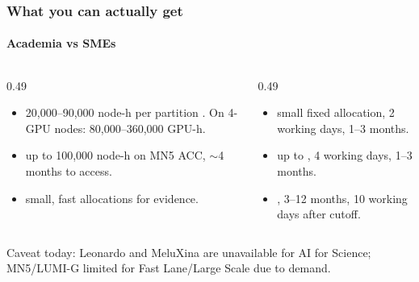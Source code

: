 \documentclass[10pt,aspectratio=169,notheorems]{beamer}
\begin{document}
\begin{frame}
    \frametitle{What you can actually get}
    \framesubtitle{Academia vs SMEs}
    \begin{columns}[t]
        \begin{column}{0.49\textwidth}
        \begin{itemize}
            \item {} 20{,}000--90{,}000 node-h per partition \citep{eurohpc2026ai}. On 4-GPU nodes: 80{,}000--360{,}000 GPU-h.
            \item {} up to 100{,}000 node-h on MN5 ACC, $\sim$4 months to access.
            \item {} small, fast allocations for evidence.
        \end{itemize}
        \end{column}

        \begin{column}{0.49\textwidth}
        \begin{itemize}
            \item {} small fixed allocation, 2 working days, 1--3 months.
            \item {} up to , 4 working days, 1--3 months.
            \item {} , 3--12 months, 10 working days after cutoff.
        \end{itemize}
        \end{column}
    \end{columns}

    \vspace{1.5em}
    \textcolor{SlidemintMuted}{Caveat today: Leonardo and MeluXina are unavailable for AI for Science; MN5/LUMI-G limited for Fast Lane/Large Scale due to demand.}
\end{frame}
\end{document}
